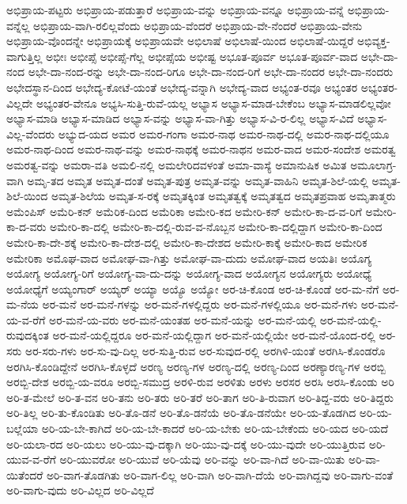 {ಅಭಿಪ್ರಾಯ-ಪಟ್ಟರು
ಅಭಿಪ್ರಾಯ-ಪಡುತ್ತಾರೆ
ಅಭಿಪ್ರಾಯ-ವನ್ನು
ಅಭಿಪ್ರಾಯ-ವನ್ನೂ
ಅಭಿಪ್ರಾಯ-ವನ್ನೆ
ಅಭಿಪ್ರಾಯ-ವನ್ನೆಲ್ಲ
ಅಭಿಪ್ರಾಯ-ವಾಗಿ-ರಲಿಲ್ಲವೆಂದು
ಅಭಿಪ್ರಾಯ-ವೆಂದರೆ
ಅಭಿಪ್ರಾಯ-ವೇ-ನೆಂದರೆ
ಅಭಿಪ್ರಾಯ-ವೇನು
ಅಭಿಪ್ರಾಯ-ವೊಂದನ್ನೇ
ಅಭಿಪ್ರಾಯಕ್ಕೆ
ಅಭಿಪ್ರಾಯವೇ
ಅಭಿಲಾಷೆ
ಅಭಿಲಾಷೆ-ಯಿಂದ
ಅಭಿಲಾಷೆ-ಯಿದ್ದರೆ
ಅಭಿವ್ಯಕ್ತ-ವಾಗುತ್ತಿಲ್ಲ
ಅಭೀಃ
ಅಭೀಪ್ಸೆ
ಅಭೀಪ್ಸೆ-ಗೆಲ್ಲ
ಅಭೀಪ್ಸೆಯ
ಅಭೀಷ್ಟ
ಅಭೂತ-ಪೂರ್ವ
ಅಭೂತ-ಪೂರ್ವ-ವಾದ
ಅಭೇ-ದಾ-ನಂದ
ಅಭೇ-ದಾ-ನಂದ-ರನ್ನು
ಅಭೇ-ದಾ-ನಂದ-ರಿಗೂ
ಅಭೇ-ದಾ-ನಂದ-ರಿಗೆ
ಅಭೇ-ದಾ-ನಂದರ
ಅಭೇ-ದಾ-ನಂದರು
ಅಭೇದಸ್ಥಾನ-ದಿಂದ
ಅಭೇದ್ಯ-ಕೋಟೆ-ಯಂತೆ
ಅಭೇದ್ಯ-ವನ್ನಾಗಿ
ಅಭೇದ್ಯ-ವಾದ
ಅಭ್ಯಂತ-ರವೂ
ಅಭ್ಯಂತರ
ಅಭ್ಯಂತರ-ವಿಲ್ಲದೇ
ಅಭ್ಯಂತರ-ವೇನೂ
ಅಭ್ಯಸಿ-ಸುತ್ತಿ-ರುವೆ-ಯಲ್ಲ
ಅಭ್ಯಾಸ
ಅಭ್ಯಾಸ-ಮಾಡ-ಬೇಕೆಂಬ
ಅಭ್ಯಾಸ-ಮಾಡಲಿಲ್ಲವೋ
ಅಭ್ಯಾಸ-ಮಾಡಿ
ಅಭ್ಯಾಸ-ಮಾಡಿದ
ಅಭ್ಯಾಸ-ವನ್ನು
ಅಭ್ಯಾಸ-ವಾ-ಗಿತ್ತು
ಅಭ್ಯಾಸ-ವಿ-ರ-ಲಿಲ್ಲ
ಅಭ್ಯಾಸ-ವಿದೆ
ಅಭ್ಯಾಸ-ವಿಲ್ಲ-ವೆಂದರು
ಅಭ್ಯುದ-ಯದ
ಅಮರ
ಅಮರ-ಗಂಗಾ
ಅಮರ-ನಾಥ
ಅಮರ-ನಾಥ-ದಲ್ಲಿ
ಅಮರ-ನಾಥ-ದಲ್ಲಿಯೂ
ಅಮರ-ನಾಥ-ದಿಂದ
ಅಮರ-ನಾಥ-ವನ್ನು
ಅಮರ-ನಾಥಕ್ಕೆ
ಅಮರ-ನಾಥನ
ಅಮರ-ವಾದ
ಅಮರ-ಸಂದೇಶ
ಅಮರತ್ವ
ಅಮರತ್ವ-ವನ್ನು
ಅಮರಾ-ವತಿ
ಅಮಲಿ-ನಲ್ಲಿ
ಅಮಲೇರಿದವಳಂತೆ
ಅಮಾ-ವಾಸ್ಯೆ
ಅಮಾನುಷಿಕ
ಅಮಿತ
ಅಮೂಲಾಗ್ರ-ವಾಗಿ
ಅಮೃ-ತದ
ಅಮೃತ
ಅಮೃತ-ದಂತೆ
ಅಮೃತ-ಪುತ್ರ
ಅಮೃತ-ವನ್ನು
ಅಮೃತ-ವಾಹಿನಿ
ಅಮೃತ-ಶಿಲೆ-ಯಲ್ಲಿ
ಅಮೃತ-ಶಿಲೆ-ಯಿಂದ
ಅಮೃತ-ಶಿಲೆಯ
ಅಮೃತ-ಸ-ರಕ್ಕೆ
ಅಮೃತಕ್ಕಿಂತ
ಅಮೃತತ್ವಕ್ಕೆ
ಅಮೃತತ್ವದ
ಅಮೃತಪ್ರವಾಹ
ಅಮೃತಾತ್ಮರು
ಅಮೆಂಪಿಸ್
ಅಮೆರಿ-ಕನ್
ಅಮೆರಿಕ-ದಿಂದ
ಅಮೆರಿಕಾ
ಅಮೇರಿ-ಕದ
ಅಮೇರಿ-ಕನ್
ಅಮೇರಿ-ಕಾ-ದ-ವ-ರಿಗೆ
ಅಮೇರಿ-ಕಾ-ದ-ವರು
ಅಮೇರಿ-ಕಾ-ದಲ್ಲಿ
ಅಮೇರಿ-ಕಾ-ದಲ್ಲಿ-ರುವ-ವ-ನೊಬ್ಬನ
ಅಮೇರಿ-ಕಾ-ದಲ್ಲಿದ್ದಾಗ
ಅಮೇರಿ-ಕಾ-ದಿಂದ
ಅಮೇರಿ-ಕಾ-ದೇ-ಶಕ್ಕೆ
ಅಮೇರಿ-ಕಾ-ದೇಶ-ದಲ್ಲಿ
ಅಮೇರಿ-ಕಾ-ದೇಶದ
ಅಮೇರಿ-ಕಾಕ್ಕೆ
ಅಮೇರಿ-ಕಾದ
ಅಮೇರಿಕ
ಅಮೇರಿಕಾ
ಅಮೊಘ-ವಾದ
ಅಮೋಘ-ವಾ-ಗಿತ್ತು
ಅಮೋಘ-ವಾ-ದುದು
ಅಮೋಘ-ವಾದ
ಅಯತಿಃ
ಅಯೊಗ್ಯ
ಅಯೋಗ್ಯ
ಅಯೋಗ್ಯ-ರಿಗೆ
ಅಯೋಗ್ಯ-ವಾ-ದು-ದನ್ನು
ಅಯೋಗ್ಯ-ವಾದ
ಅಯೋಗ್ಯನ
ಅಯೋಗ್ಯರು
ಅಯೋಧ್ಯೆ
ಅಯೋಧ್ಯೆಗೆ
ಅಯ್ಯಂಗಾರ್
ಅಯ್ಯರ್
ಅಯ್ಯಾ
ಅಯ್ಯೊ
ಅಯ್ಯೋ
ಅರ-ಚಿ-ಕೊಂಡ
ಅರ-ಚಿ-ಕೊಂಡೆ
ಅರ-ಮ-ನೆಗೆ
ಅರ-ಮ-ನೆಯ
ಅರ-ಮನೆ
ಅರ-ಮನೆ-ಗಳನ್ನು
ಅರ-ಮನೆ-ಗಳಲ್ಲಿದ್ದರು
ಅರ-ಮನೆ-ಗಳಲ್ಲಿಯೂ
ಅರ-ಮನೆ-ಗಳು
ಅರ-ಮನೆ-ಯ-ವ-ರೆಗೆ
ಅರ-ಮನೆ-ಯ-ವರು
ಅರ-ಮನೆ-ಯಂತಹ
ಅರ-ಮನೆ-ಯನ್ನು
ಅರ-ಮನೆ-ಯಲ್ಲಿ
ಅರ-ಮನೆ-ಯಲ್ಲಿ-ರುವುದಕ್ಕಿಂತ
ಅರ-ಮನೆ-ಯಲ್ಲಿದ್ದರೂ
ಅರ-ಮನೆ-ಯಲ್ಲಿದ್ದಾಗ
ಅರ-ಮನೆ-ಯಲ್ಲಿಯೇ
ಅರ-ಮನೆ-ಯೊಂದ-ರಲ್ಲಿ
ಅರ-ಸರು
ಅರ-ಸರು-ಗಳು
ಅರ-ಸು-ವು-ದಿಲ್ಲ
ಅರ-ಸುತ್ತಿ-ರುವ
ಅರ-ಸುವುದ-ರಲ್ಲಿ
ಅರಗಿಳಿ-ಯಂತೆ
ಅರಗಿಸಿ-ಕೊಂಡರೊ
ಅರಗಿಸಿ-ಕೊಂಡಿದ್ದೇನೆ
ಅರಗಿಸಿ-ಕೊಳ್ಳದೆ
ಅರಣ್ಯ
ಅರಣ್ಯ-ಗಳ
ಅರಣ್ಯ-ದಲ್ಲಿ
ಅರಣ್ಯ-ದಿಂದ
ಅರಣ್ಯಾರಣ್ಯ-ಗಳ
ಅರಬ್ಬಿ
ಅರಬ್ಬಿ-ದೇಶ
ಅರಬ್ಬಿ-ಯ-ವರೂ
ಅರಬ್ಬಿ-ಸಮುದ್ರ
ಅರಳಿ-ರುವ
ಅರಳಿತು
ಅರಳು
ಅರಸರ
ಅರಸಿ
ಅರಸಿ-ಕೊಂಡು
ಅರಿ
ಅರಿ-ತ-ಮೇಲೆ
ಅರಿ-ತ-ವನ
ಅರಿ-ತನು
ಅರಿ-ತರು
ಅರಿ-ತರೆ
ಅರಿ-ತಾಗ
ಅರಿ-ತಿ-ರುವಾಗ
ಅರಿ-ತಿದ್ದ-ವರು
ಅರಿ-ತಿದ್ದರು
ಅರಿ-ತಿಲ್ಲ
ಅರಿ-ತು-ಕೊಂಡಿತು
ಅರಿ-ತೊ-ಡನೆ
ಅರಿ-ತೊ-ಡನೆಯೆ
ಅರಿ-ತೊ-ಡನೆಯೇ
ಅರಿ-ಯ-ತೊಡಗಿದ
ಅರಿ-ಯ-ಬಲ್ಲೆಯಾ
ಅರಿ-ಯ-ಬೇ-ಕಾಗಿದೆ
ಅರಿ-ಯ-ಬೇ-ಕಾದರೆ
ಅರಿ-ಯ-ಬೇಕು
ಅರಿ-ಯ-ಬೇಕೆಂದು
ಅರಿ-ಯದ
ಅರಿ-ಯದೆ
ಅರಿ-ಯಲಾ-ರದ
ಅರಿ-ಯಲು
ಅರಿ-ಯು-ವು-ದಕ್ಕಾಗಿ
ಅರಿ-ಯು-ವು-ದಕ್ಕೆ
ಅರಿ-ಯು-ವುದೇ
ಅರಿ-ಯುತ್ತಿರುವ
ಅರಿ-ಯುವ-ವ-ರೆಗೆ
ಅರಿ-ಯುವರೋ
ಅರಿ-ಯುವೆ
ಅರಿ-ಯೆವು
ಅರಿ-ವನ್ನು
ಅರಿ-ವಾ-ಗಿದೆ
ಅರಿ-ವಾ-ಯಿತು
ಅರಿ-ವಾ-ಯಿತೆಂದರೆ
ಅರಿ-ವಾಗ-ತೊಡಗಿತು
ಅರಿ-ವಾಗ-ಲಿಲ್ಲ
ಅರಿ-ವಾಗಿ
ಅರಿ-ವಾಗಿ-ದೆಯೆ
ಅರಿ-ವಾಗಿದ್ದವು
ಅರಿ-ವಾಗು-ವಂತೆ
ಅರಿ-ವಾಗು-ವುದು
ಅರಿ-ವಿಲ್ಲದ
ಅರಿ-ವಿಲ್ಲದೆ
}
